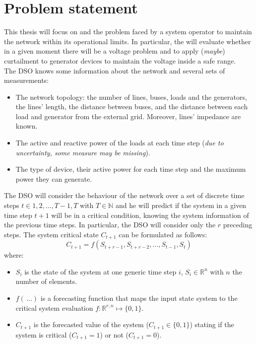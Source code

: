 \section{Problem statement}
\label{sec:ps}
This thesis will focus on  and the problem faced by a system operator to maintain the network within its operational limits. In particular, the  will evaluate whether in a given moment there will be a voltage problem and to apply (\emph{maybe}) curtailment to generator devices to maintain the voltage inside a safe range.\\

The \gls{DSO} knows some information about the network and several sets of measurements: 
\begin{itemize}
    \item The network topology: the number of lines, buses, loads and the generators, the lines' length, the distance between buses, and the distance between each load and generator from the external grid. Moreover, lines' impedance are known.
    \item The active and reactive power of the loads at each time step (\emph{due to uncertainty, some measure may be missing}).
    \item The type of  device, their active power for each time step and the maximum power they can generate.
\end{itemize}

The \gls{DSO} will consider the behaviour of the network over a set of discrete time steps $t \in {1,2,...,T-1,T}$ with $T \in \mathbb{N}$ and he will predict if the system in a given time step $t+1$ will be in a critical condition, knowing the system information of the previous time steps. In particular, the \gls{DSO} will consider only the $r$ preceding steps. The system critical state $C_{t+1}$ can be formulated as follows: 
\begin{equation} \label{eq:fmapping}
    C_{t+1} = f(S_{t+r-1},S_{t+r-2},\dots,S_{t-1},S_{t})
\end{equation}
\noindent where:
\begin{itemize}
    \item $S_i$ is the state of the system at one generic time step $i$, $S_i \in \mathbb{R}^n$ with $n$ the number of elements.
    \item $f(\,\dots)$ is a forecasting function that maps the input state system to the critical system evaluation $f: \mathbb{R}^{r,n} \mapsto \{0,1\}$.
    \item $C_{t+1}$ is the forecasted value of the system ($C_{t+1} \in \{0,1\}$) stating if the system is critical ($C_{t+1}=1$) or not ($C_{t+1}=0$). 
\end{itemize}

